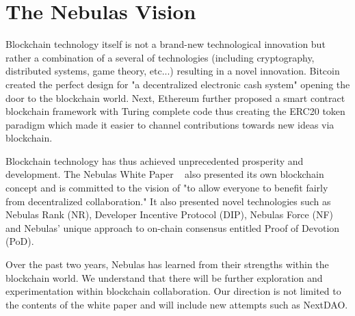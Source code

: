 \section {The Nebulas Vision}
Blockchain technology itself is not a brand-new technological innovation but rather a combination of a several of technologies (including cryptography, distributed systems, game theory, etc...) resulting in a novel innovation. Bitcoin ~\cite{Nakamoto2008} created the perfect design for "a decentralized electronic cash system" opening the door to the blockchain world. Next, Ethereum further proposed a smart contract blockchain framework with Turing complete code thus creating the ERC20 token paradigm which made it easier to channel contributions towards new ideas via blockchain.

Blockchain technology has thus achieved unprecedented prosperity and development. The Nebulas White Paper ~\cite{TechWhitepaper} also presented its own blockchain concept and is committed to the vision of "to allow everyone to benefit fairly from decentralized collaboration." It also presented novel technologies such as Nebulas Rank (NR), Developer Incentive Protocol (DIP), Nebulas Force (NF) and Nebulas' unique approach to on-chain consensus entitled Proof of Devotion (PoD).

Over the past two years, Nebulas has learned from their strengths within the blockchain world. We understand that there will be further exploration and experimentation within blockchain collaboration. Our direction is not limited to the contents of the white paper and will include new attempts such as NextDAO.

